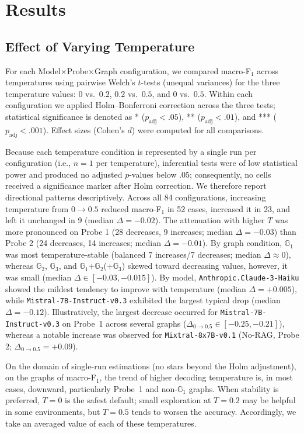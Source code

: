\section{Results}

\subsection{Effect of Varying Temperature}
For each Model$\times$Probe$\times$Graph configuration, we compared macro-F$_1$ across temperatures using pairwise Welch's $t$-tests (unequal variances) for the three temperature values: $0$ vs.\ $0.2$, $0.2$ vs.\ $0.5$, and $0$ vs.\ $0.5$. Within each configuration we applied Holm–Bonferroni correction across the three tests; statistical significance is denoted as * ($p_{\text{adj}}{<}.05$), ** ($p_{\text{adj}}{<}.01$), and *** ($p_{\text{adj}}{<}.001$). Effect sizes (Cohen’s $d$) were computed for all comparisons.

Because each temperature condition is represented by a single run per configuration (i.e., $n{=}1$ per temperature), inferential tests were of low statistical power and produced no adjusted $p$-values below $.05$; consequently, no cells received a significance marker after Holm correction. We therefore report directional patterns descriptively. Across all 84 configurations, increasing temperature from $0{\to}0.5$ reduced macro-F$_1$ in 52 cases, increased it in 23, and left it unchanged in 9 (median $\Delta=-0.02$). The attenuation with higher $T$ was more pronounced on Probe 1 (28 decreases, 9 increases; median $\Delta=-0.03$) than Probe 2 (24 decreases, 14 increases; median $\Delta=-0.01$). By graph condition, $\mathbb{G}_1$ was most temperature-stable (balanced 7 increases/7 decreases; median $\Delta\approx0$), whereas $\mathbb{G}_2$, $\mathbb{G}_3$, and $\mathbb{G}_1$+$\mathbb{G}_2$(+$\mathbb{G}_3$) skewed toward decreasing values, however, it was small (median $\Delta\in[-0.03,-0.015]$). By model, \texttt{Anthropic.Claude-3-Haiku} showed the mildest tendency to improve with temperature (median $\Delta{=}+0.005$), while \texttt{Mistral-7B-Instruct-v0.3} exhibited the largest typical drop (median $\Delta{=}-0.12$). Illustratively, the largest decrease occurred for \texttt{Mistral-7B-Instruct-v0.3} on Probe~1 across several graphs ($\Delta_{0{\to}0.5}\in[-0.25,-0.21]$), whereas a notable increase was observed for \texttt{Mixtral-8x7B-v0.1} (No-RAG, Probe 2; $\Delta_{0{\to}0.5}{=}+0.09$).

On the domain of single-run estimations (no stars beyond the Holm adjustment), on the graphs of macro-F$_1$, the trend of higher decoding temperature is, in most cases, downward, particularly Probe~1 and non-$\mathbb{G}_1$ graphs. When stability is preferred, $T{=}0$ is the safest default; small exploration at $T{=}0.2$ may be helpful in some environments, but $T{=}0.5$ tends to worsen the accuracy. Accordingly, we take an averaged value of each of these temperatures.

